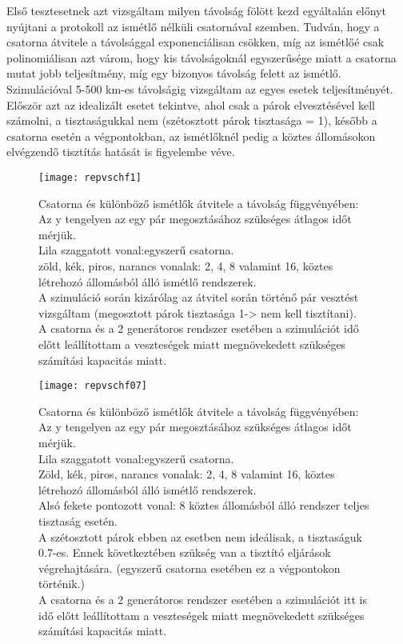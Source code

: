 Első tesztesetnek azt vizsgáltam milyen távolság fölött kezd egyáltalán előnyt nyújtani a protokoll az ismétlő nélküli csatornával szemben. Tudván, hogy a csatorna átvitele a távolsággal exponenciálisan csökken, míg az ismétlőé csak polinomiálisan \cite{briegel1998quantum} azt várom, hogy kis távolságoknál egyszerűsége miatt a csatorna mutat jobb teljesítmény, míg egy bizonyos távolság felett az ismétlő. Szimulációval 5-500 km-es távolságig vizsgáltam az egyes esetek teljesítményét. Először azt az idealizált esetet tekintve, ahol csak a párok elvesztésével kell számolni, a tisztaságukkal nem (szétosztott párok tisztasága = 1), később a csatorna esetén a végpontokban, az ismétlőknél pedig a köztes állomásokon elvégzendő tisztítás hatását is figyelembe véve.
\begin{figure}[H]
\centering
\texttt{[image: repvschf1]}
\caption[Csatorna és ismétlők karakterisztikája 1]
{Csatorna és különböző ismétlők átvitele a távolság függvényében:\\
Az y tengelyen az egy pár megosztásához szükséges átlagos időt mérjük.\\
Lila szaggatott vonal:egyszerű csatorna.\\
zöld, kék, piros, narancs vonalak: 2, 4, 8 valamint 16, köztes létrehozó állomásból álló ismétlő rendszerek.\\
A szimuláció során kizárólag az átvitel során történő pár vesztést vizsgáltam (megosztott párok tisztasága 1-> nem kell tisztítani).\\
A csatorna és a 2 generátoros rendszer esetében a szimulációt idő előtt leállítottam a veszteségek miatt megnövekedett szükséges számítási kapacitás miatt.
}
\end{figure}
\begin{figure}[H]
\centering
\texttt{[image: repvschf07]}
\caption[Csatorna és ismétlők karakterisztikája 2]
{Csatorna és különböző ismétlők átvitele a távolság függvényében:\\
Az y tengelyen az egy pár megosztásához szükséges átlagos időt mérjük.\\
Lila szaggatott vonal:egyszerű csatorna.\\
Zöld, kék, piros, narancs vonalak: 2, 4, 8 valamint 16, köztes létrehozó állomásból álló ismétlő rendszerek.\\
Alsó fekete pontozott vonal: 8 köztes állomásból álló rendszer teljes tisztaság esetén.\\
A szétosztott párok ebben az esetben nem ideálisak, a tisztaságuk 0.7-es. Ennek következtében szükség van a tisztító eljárások végrehajtására. (egyszerű csatorna esetében ez a végpontokon történik.)\\
A csatorna és a 2 generátoros rendszer esetében a szimulációt itt is idő előtt leállítottam a veszteségek miatt megnövekedett szükséges számítási kapacitás miatt.
}
\end{figure}
